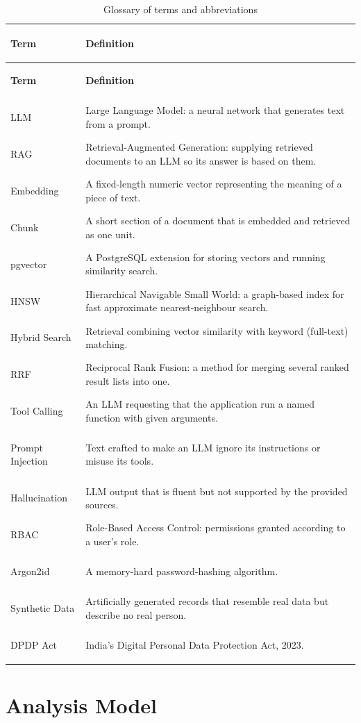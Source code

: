 \documentclass[11pt,a4paper,oneside]{report}
\begin{document}
\begin{longtable}{@{}>{\bfseries\raggedright\arraybackslash}p{3.6cm}>{\raggedright\arraybackslash}p{11cm}@{}}
\caption{Glossary of terms and abbreviations}\label{tab:glossary}\\
\toprule
\textnormal{\textbf{Term}} & \textbf{Definition}\\
\midrule
\endfirsthead
\toprule
\textnormal{\textbf{Term}} & \textbf{Definition}\\
\midrule
\endhead
\bottomrule
\endfoot
LLM & Large Language Model: a neural network that generates text from a prompt.\\
RAG & Retrieval-Augmented Generation: supplying retrieved documents to an LLM so its answer
is based on them.\\
Embedding & A fixed-length numeric vector representing the meaning of a piece of text.\\
Chunk & A short section of a document that is embedded and retrieved as one unit.\\
pgvector & A PostgreSQL extension for storing vectors and running similarity search.\\
HNSW & Hierarchical Navigable Small World: a graph-based index for fast approximate
nearest-neighbour search.\\
Hybrid Search & Retrieval combining vector similarity with keyword (full-text) matching.\\
RRF & Reciprocal Rank Fusion: a method for merging several ranked result lists into one.\\
Tool Calling & An LLM requesting that the application run a named function with given
arguments.\\
Prompt Injection & Text crafted to make an LLM ignore its instructions or misuse its tools.\\
Hallucination & LLM output that is fluent but not supported by the provided sources.\\
RBAC & Role-Based Access Control: permissions granted according to a user's role.\\
Argon2id & A memory-hard password-hashing algorithm.\\
Synthetic Data & Artificially generated records that resemble real data but describe no real
person.\\
DPDP Act & India's Digital Personal Data Protection Act, 2023.\\
\end{longtable}

\chapter{Analysis Model}
\end{document}
